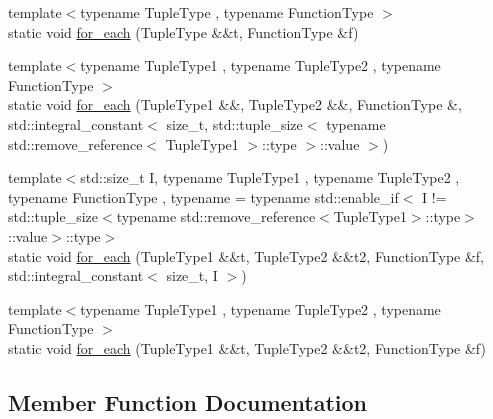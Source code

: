 \begin{DoxyCompactItemize}
\item 
{\footnotesize template$<$typename Tuple\+Type , typename Function\+Type $>$ }\\static void \mbox{\hyperlink{structfakeit_1_1TupleDispatcher_a8fd292a71795aae0aba215dad28ee4c2}{for\+\_\+each}} (Tuple\+Type \&\&t, Function\+Type \&f)
\item 
{\footnotesize template$<$typename Tuple\+Type1 , typename Tuple\+Type2 , typename Function\+Type $>$ }\\static void \mbox{\hyperlink{structfakeit_1_1TupleDispatcher_a30fb1a59df83f4faaa461d3fee4b20bc}{for\+\_\+each}} (Tuple\+Type1 \&\&, Tuple\+Type2 \&\&, Function\+Type \&, std\+::integral\+\_\+constant$<$ size\+\_\+t, std\+::tuple\+\_\+size$<$ typename std\+::remove\+\_\+reference$<$ Tuple\+Type1 $>$\+::type $>$\+::value $>$)
\item 
{\footnotesize template$<$std\+::size\+\_\+t I, typename Tuple\+Type1 , typename Tuple\+Type2 , typename Function\+Type , typename  = typename std\+::enable\+\_\+if$<$            I != std\+::tuple\+\_\+size$<$typename std\+::remove\+\_\+reference$<$\+Tuple\+Type1$>$\+::type$>$\+::value$>$\+::type$>$ }\\static void \mbox{\hyperlink{structfakeit_1_1TupleDispatcher_a42566b7faaac776dc99492e7c0b973b3}{for\+\_\+each}} (Tuple\+Type1 \&\&t, Tuple\+Type2 \&\&t2, Function\+Type \&f, std\+::integral\+\_\+constant$<$ size\+\_\+t, I $>$)
\item 
{\footnotesize template$<$typename Tuple\+Type1 , typename Tuple\+Type2 , typename Function\+Type $>$ }\\static void \mbox{\hyperlink{structfakeit_1_1TupleDispatcher_a1ddb90f24aa73dd61bf2b95c5f176cd5}{for\+\_\+each}} (Tuple\+Type1 \&\&t, Tuple\+Type2 \&\&t2, Function\+Type \&f)
\end{DoxyCompactItemize}


\subsection{Member Function Documentation}
\mbox{\label{structfakeit_1_1TupleDispatcher_ac57ede994f304c03e3982e6fa4d1ca41}} 
